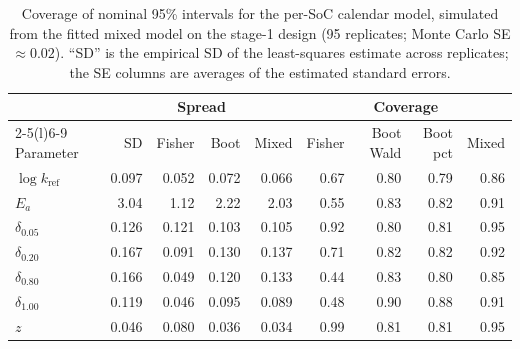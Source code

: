 \documentclass[11pt,letterpaper]{article}
\begin{document}
\begin{table}[H]
\centering\small
\caption{Coverage of nominal 95\% intervals for the per-SoC calendar model, simulated from the fitted mixed model on the stage-1 design (95 replicates; Monte Carlo SE $\approx0.02$). ``SD'' is the empirical SD of the least-squares estimate across replicates; the SE columns are averages of the estimated standard errors.}\label{tab:cov}
\begin{tabular}{@{}lrrrrrrrr@{}}
\toprule
 & \multicolumn{4}{c}{Spread} & \multicolumn{4}{c}{Coverage} \\
\cmidrule(lr){2-5}\cmidrule(l){6-9}
Parameter & SD & Fisher & Boot & Mixed & Fisher & Boot Wald & Boot pct & Mixed \\
\midrule
$\log k_{\mathrm{ref}}$ & 0.097 & 0.052 & 0.072 & 0.066 & 0.67 & 0.80 & 0.79 & 0.86 \\
$E_a$ & 3.04 & 1.12 & 2.22 & 2.03 & 0.55 & 0.83 & 0.82 & 0.91 \\
$\delta_{0.05}$ & 0.126 & 0.121 & 0.103 & 0.105 & 0.92 & 0.80 & 0.81 & 0.95 \\
$\delta_{0.20}$ & 0.167 & 0.091 & 0.130 & 0.137 & 0.71 & 0.82 & 0.82 & 0.92 \\
$\delta_{0.80}$ & 0.166 & 0.049 & 0.120 & 0.133 & 0.44 & 0.83 & 0.80 & 0.85 \\
$\delta_{1.00}$ & 0.119 & 0.046 & 0.095 & 0.089 & 0.48 & 0.90 & 0.88 & 0.91 \\
$z$ & 0.046 & 0.080 & 0.036 & 0.034 & 0.99 & 0.81 & 0.81 & 0.95 \\
\bottomrule
\end{tabular}
\end{table}
\end{document}
